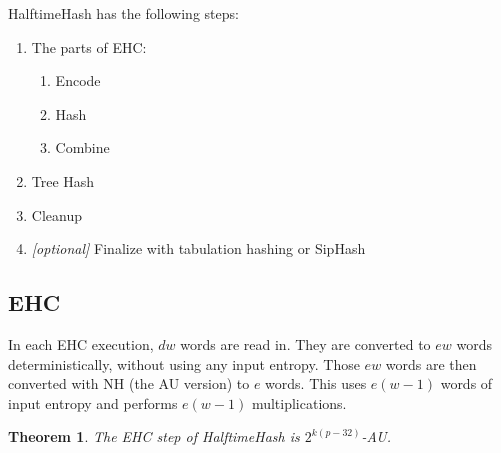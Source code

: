 \documentclass[sigconf, nonacm]{acmart}
\newtheorem{theorem}{Theorem}
\begin{document}
HalftimeHash has the following steps:

\begin{enumerate}
\item The parts of EHC:
  \begin {enumerate}
  \item Encode
  \item Hash
  \item Combine
  \end{enumerate}
\item Tree Hash
\item Cleanup
\item{} {\em [optional]} Finalize with tabulation hashing or SipHash
\end{enumerate}

\subsection{EHC}

In each EHC execution, $dw$ words are read in.
They are converted to $ew$ words deterministically, without using any input entropy.
Those $ew$ words are then converted with NH (the AU version) to $e$ words.
This uses $e(w - 1)$ words of input entropy and performs $e(w - 1)$ multiplications.

\begin{theorem}
  The EHC step of HalftimeHash is $2^{k(p-32)}$-AU.
\end{theorem}
\end{document}
